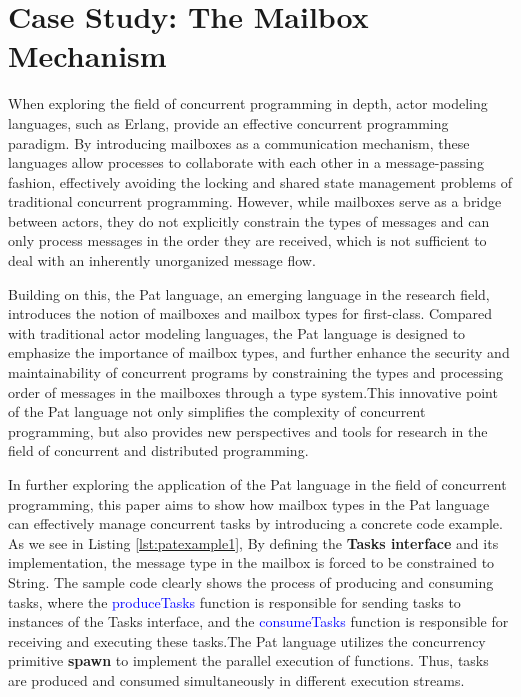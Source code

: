 \documentclass{l4proj}
\begin{document}
\section{Case Study: The Mailbox Mechanism}

When exploring the field of concurrent programming in depth, actor modeling languages, such as Erlang, provide an effective concurrent programming paradigm. By introducing mailboxes as a communication mechanism, these languages allow processes to collaborate with each other in a message-passing fashion, effectively avoiding the locking and shared state management problems of traditional concurrent programming. However, while mailboxes serve as a bridge between actors, they do not explicitly constrain the types of messages and can only process messages in the order they are received, which is not sufficient to deal with an inherently unorganized message flow.

Building on this, the Pat language, an emerging language in the research field, introduces the notion of mailboxes and mailbox types for first-class. Compared with traditional actor modeling languages, the Pat language is designed to emphasize the importance of mailbox types, and further enhance the security and maintainability of concurrent programs by constraining the types and processing order of messages in the mailboxes through a type system.This innovative point of the Pat language not only simplifies the complexity of concurrent programming, but also provides new perspectives and tools for research in the field of concurrent and distributed programming.

In further exploring the application of the Pat language in the field of concurrent programming, this paper aims to show how mailbox types in the Pat language can effectively manage concurrent tasks by introducing a concrete code example. As we see in Listing \ref{lst:patexample1}, By defining the \textbf{Tasks interface} and its implementation, the message type in the mailbox is forced to be constrained to String. The sample code clearly shows the process of producing and consuming tasks, where the \textcolor{blue}{produceTasks} function is responsible for sending tasks to instances of the Tasks interface, and the \textcolor{blue}{consumeTasks} function is responsible for receiving and executing these tasks.The Pat language utilizes the concurrency primitive \textbf{spawn} to implement the parallel execution of functions. Thus, tasks are produced and consumed simultaneously in different execution streams. 
\end{document}
